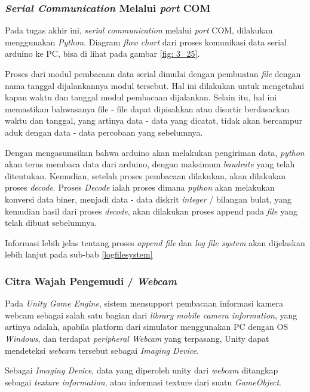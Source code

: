         \subsubsection{\textit{Serial Communication} Melalui \textit{port} COM}
        Pada tugas akhir ini, \textit{serial communication} melalui \textit{port} COM, dilakukan menggunakan \textit{Python}. Diagram \textit{flow chart} dari proses komunikasi data serial arduino ke PC, bisa di lihat pada gambar \ref{fig: 3_25}.
        \par Proses dari modul pembacaan data serial dimulai dengan pembuatan \textit{file} dengan nama tanggal dijalankannya modul tersebut. Hal ini dilakukan untuk mengetahui kapan waktu dan tanggal modul pembacaan dijalankan. Selain itu, hal ini memastikan bahwasanya file - file dapat dipisahkan atau disortir berdasarkan waktu dan tanggal, yang artinya data - data yang dicatat, tidak akan bercampur aduk dengan data - data percobaan yang sebelumnya.
        \par Dengan mengasumsikan bahwa arduino akan melakukan pengiriman data, \textit{python} akan terus membaca data dari arduino, dengan maksimum \textit{baudrate} yang telah ditentukan. Kemudian, setelah proses pembacaan dilakukan, akan dilakukan proses \textit{decode}. Proses \textit{Decode} ialah proses dimana \textit{python} akan melakukan konversi data biner, menjadi data - data diskrit \textit{integer} / bilangan bulat, yang kemudian hasil dari proses \textit{decode}, akan dilakukan proses append pada \textit{file} yang telah dibuat sebelumnya. 
        \par Informasi lebih jelas tentang proses \textit{append file} dan \textit{log file system} akan dijelaskan lebih lanjut pada sub-bab \ref{logfilesystem}
        
        \subsubsection{Citra Wajah Pengemudi / \textit{Webcam}}
        Pada \textit{Unity Game Engine}, sistem mensupport pembacaan informasi kamera webcam sebagai salah satu bagian dari \textit{library mobile camera information}, yang artinya adalah, apabila platform dari simulator menggunakan PC dengan OS \textit{Windows}, dan terdapat \textit{peripheral Webcam} yang terpasang, Unity dapat mendeteksi \textit{webcam} tersebut sebagai \textit{Imaging Device}.
        \par Sebagai \textit{Imaging Device}, data yang diperoleh unity dari \textit{webcam} ditangkap sebagai \textit{texture information}, atau informasi texture dari suatu \textit{GameObject}.
        
